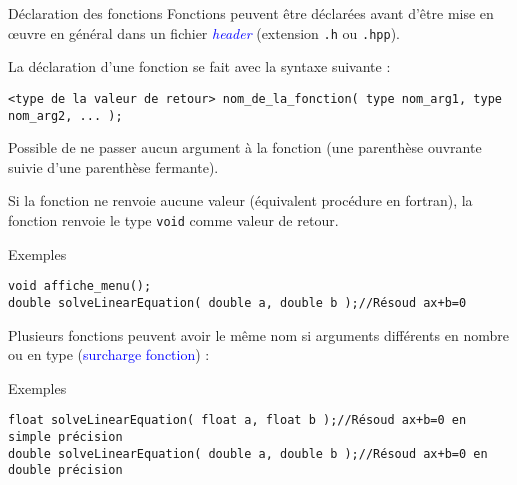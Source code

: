 \documentclass[compress,10pt,aspectratio=169]{beamer}
\begin{document}
\begin{frame}[fragile]{Déclaration des fonctions}
    \scriptsize
    Fonctions peuvent être déclarées avant d'être mise en {\oe}uvre en général dans un fichier \textsl{\textcolor{blue}{header}} 
    (extension \texttt{.h} ou \texttt{.hpp}).

    La déclaration d'une fonction se fait avec la syntaxe suivante :
\begin{verbatim}
<type de la valeur de retour> nom_de_la_fonction( type nom_arg1, type nom_arg2, ... );
\end{verbatim}
Possible de ne passer aucun argument à la fonction (une parenthèse ouvrante suivie d'une parenthèse fermante).

Si la fonction ne renvoie aucune valeur (équivalent procédure en fortran), la fonction renvoie le type \texttt{void} comme valeur de retour.

\begin{exampleblock}{\small Exemples}
\begin{verbatim}
void affiche_menu();
double solveLinearEquation( double a, double b );//Résoud ax+b=0
\end{verbatim}
\end{exampleblock}

Plusieurs fonctions peuvent avoir le même nom si arguments différents en nombre ou en type (\textcolor{blue}{surcharge fonction}) :
\begin{exampleblock}{\small Exemples}
\begin{verbatim}
float solveLinearEquation( float a, float b );//Résoud ax+b=0 en simple précision
double solveLinearEquation( double a, double b );//Résoud ax+b=0 en double précision
\end{verbatim}
\end{exampleblock}
\end{frame}
\end{document}
